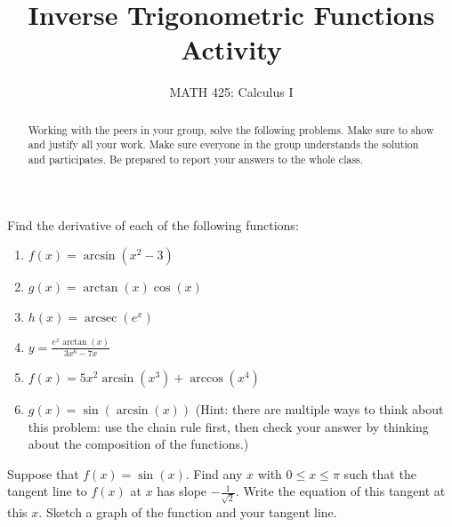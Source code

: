 \documentclass{ximera}
\title{Inverse Trigonometric Functions Activity}
\author{MATH 425: Calculus I}
\begin{document}
\begin{abstract}
    Working with the peers in your group, solve the following problems. Make sure to show and justify all your work. Make sure everyone in the group understands the solution and participates. Be prepared to report your answers to the whole class. 
\end{abstract}
\maketitle


\begin{exercise}
    Find the derivative of each of the following functions:
    \begin{enumerate}
        \item $f(x)=\arcsin(x^2-3)$
        \item $g(x)=\arctan(x)\cos(x)$
        \item $h(x)=\operatorname{arcsec}(e^x)$
        \item $y=\frac{e^x\arctan(x)}{3x^6-7x}$
        \item $f(x)=5x^2\arcsin(x^3)+\arccos(x^4)$
        \item $g(x)=\sin(\arcsin(x))$ (Hint: there are multiple ways to think about this problem: use the chain rule first, then check your answer by thinking about the composition of the functions.)
    \end{enumerate}
\end{exercise}

\begin{exercise}
    Suppose that $f(x)=\sin(x)$.  Find any $x$ with $0\leq x\leq \pi$ such that the tangent line to $f(x)$ at $x$ has slope $-\frac{1}{\sqrt{2}}$.  Write the equation of this tangent at this $x$. Sketch a graph of the function and your tangent line. 
\end{exercise}
\end{document}

